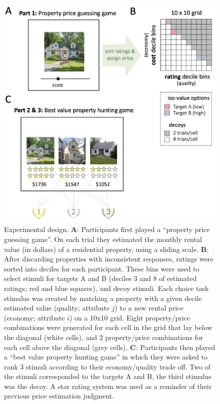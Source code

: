 \documentclass[a4paper, nobind]{templates/ociamthesis}
\begin{document}
\begin{figure}

{\centering \includegraphics[width=0.9\linewidth]{figures/decoy-methods} 

}

\caption[Experimental design]{Experimental design. $\textbf{A:}$ Participants first played a “property price guessing game”.  On each trial they estimated the monthly rental value (in dollars) of a residential property, using a sliding scale. $\textbf{B:}$ After discarding properties with inconsistent responses, ratings were sorted into deciles for each participant. These bins were used to select stimuli for targets A and B (deciles 3 and 8 of estimated ratings; red and blue squares), and decoy stimuli. Each choice task stimulus was created by matching a property with a given decile estimated value (quality; attribute $j$) to a new rental price (economy; attribute $i$) on a 10x10 grid. Eight property/price combinations were generated for each cell in the grid that lay below the diagonal (white cells), and 2 property/price combinations for each cell above the diagonal (grey cells). $\textbf{C:}$ Participants then played a “best value property hunting game” in which they were asked to rank 3 stimuli according to their economy/quality trade off. Two of the stimuli corresponded to the targets A and B, the third stimulus was the decoy. A star rating system was used as a reminder of their previous price estimation judgment.}\label{fig:decoy-methods}
\end{figure}
\end{document}
